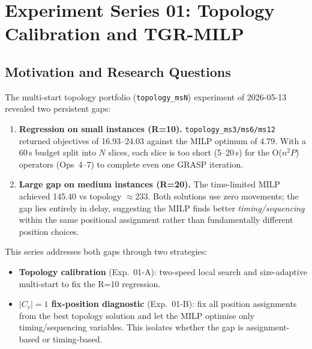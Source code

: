 \section{Experiment Series 01: Topology Calibration and TGR-MILP}
\label{sec:exp01}

\subsection{Motivation and Research Questions}

The multi-start topology portfolio (\texttt{topology\_msN}) experiment of
2026-05-13 revealed two persistent gaps:

\begin{enumerate}[noitemsep]
    \item \textbf{Regression on small instances (R=10).}
          \texttt{topology\_ms3/ms6/ms12} returned objectives of 16.93--24.03
          against the MILP optimum of 4.79.  With a 60\,s budget split into
          $N$ slices, each slice is too short (5--20\,s) for the
          O($n^2 P$) operators (Ops~4--7) to complete even one GRASP iteration.
    \item \textbf{Large gap on medium instances (R=20).}
          The time-limited MILP achieved 145.40 vs topology $\approx$233.
          Both solutions use zero movements; the gap lies entirely in delay,
          suggesting the MILP finds better \emph{timing/sequencing} within the
          same positional assignment rather than fundamentally different position
          choices.
\end{enumerate}

\noindent This series addresses both gaps through two strategies:
\begin{itemize}[noitemsep]
    \item \textbf{Topology calibration} (Exp.~01-A): two-speed local search and
          size-adaptive multi-start to fix the R=10 regression.
    \item \textbf{$|C_r|=1$ fix-position diagnostic} (Exp.~01-B): fix all position
          assignments from the best topology solution and let the MILP optimise
          only timing/sequencing variables.  This isolates whether the gap is
          assignment-based or timing-based.
\end{itemize}

